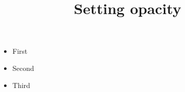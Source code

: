 \documentclass{ltx-talk}
\title{Setting opacity}
\begin{document}
\begin{frame}
  \begin{itemize}[<+->]
    \item First
    \item Second
    \item Third
  \end{itemize}
\end{frame}
\end{document}
